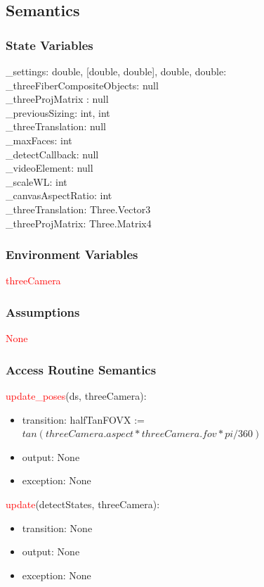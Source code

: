 \documentclass[12pt, titlepage]{article}
\begin{document}
\subsection{Semantics}

\subsubsection{State Variables}
\_settings: {double, [double, double], double, double}:
\_threeFiberCompositeObjects: null\\
\_threeProjMatrix : null\\
\_previousSizing: {int, int}\\
\_threeTranslation: null\\
\_maxFaces: int\\
\_detectCallback: null\\
\_videoElement: null\\
\_scaleWL: int\\
\_canvasAspectRatio: int\\
\_threeTranslation: Three.Vector3\\
\_threeProjMatrix: Three.Matrix4\\

\subsubsection{Environment Variables}
\textcolor{red}{threeCamera}

\subsubsection{Assumptions}
\textcolor{red}{None}

\subsubsection{Access Routine Semantics}


\noindent \textcolor{red}{update\_poses}(ds, threeCamera):
\begin{itemize}
\item transition: halfTanFOVX := $tan(threeCamera.aspect * threeCamera.fov * pi /360)$
\item output: None
\item exception: None
\end{itemize}

\noindent \textcolor{red}{update}(detectStates, threeCamera):
\begin{itemize}
\item transition: None
\item output: None
\item exception: None
\end{itemize}
\end{document}
